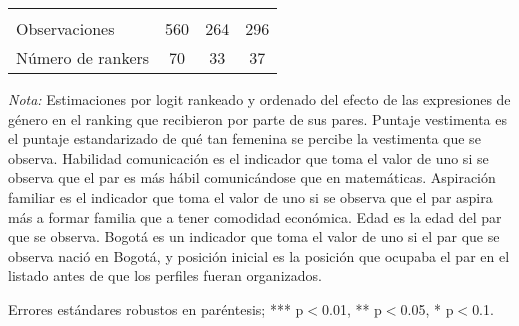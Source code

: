 \begin{table}[ht!]
\begin{threeparttable}
{\begin{tabular}{lccc}
                                                &           &           &           \\
    Observaciones                               &   560     &   264     &   296     \\
    Número de rankers                           &   70      &   33      &   37      \\ \hline \hline
    \end{tabular}}
    \begin{tablenotes}
    \footnotesize{
    \item \textit{Nota:} Estimaciones por logit rankeado y ordenado del efecto de las expresiones de género en el ranking que recibieron por parte de sus pares. Puntaje vestimenta es el puntaje estandarizado de qué tan femenina se percibe la vestimenta que se observa. Habilidad comunicación es el indicador que toma el valor de uno si se observa que el par es más hábil comunicándose que en matemáticas. Aspiración familiar es el indicador que toma el valor de uno si se observa que el par aspira más a formar familia que a tener comodidad económica. Edad es la edad del par que se observa. Bogotá es un indicador que toma el valor de uno si el par que se observa nació en Bogotá, y posición inicial es la posición que ocupaba el par en el listado antes de que los perfiles fueran organizados. 
    \item Errores estándares robustos en paréntesis; *** p$<$0.01, ** p$<$0.05, * p$<$0.1.}
    \end{tablenotes}
    \end{threeparttable}
\end{table}

